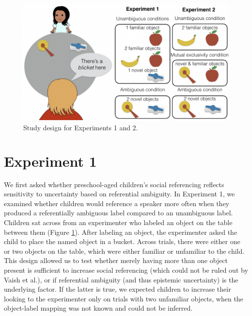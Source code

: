\documentclass[10pt, letterpaper]{article}
\newenvironment{CodeChunk}{}{}
\begin{document}
\begin{CodeChunk}
\captionsetup{width=0.8\columnwidth}\begin{figure}[h]

{\centering \includegraphics{figs/design-1} 

}

\caption[Study design for Experiments 1 and 2]{Study design for Experiments 1 and 2.}\label{fig:design}
\end{figure}
\end{CodeChunk}

\section{Experiment 1}\label{experiment-1}

We first asked whether preschool-aged children's social referencing
reflects sensitivity to uncertainty based on referential ambiguity. In
Experiment 1, we examined whether children would reference a speaker
more often when they produced a referentially ambiguous label compared
to an unambiguous label. Children sat across from an experimenter who
labeled an object on the table between them (Figure \ref{fig:design}).
After labeling an object, the experimenter asked the child to place the
named object in a bucket. Across trials, there were either one or two
objects on the table, which were either familiar or unfamiliar to the
child. This design allowed us to test whether merely having more than
one object present is sufficient to increase social referencing (which
could not be ruled out by Vaish et al.), or if referential ambiguity
(and thus epistemic uncertainty) is the underlying factor. If the latter
is true, we expected children to increase their looking to the
experimenter only on trials with two unfamiliar objects, when the
object-label mapping was not known and could not be inferred.
\end{document}
